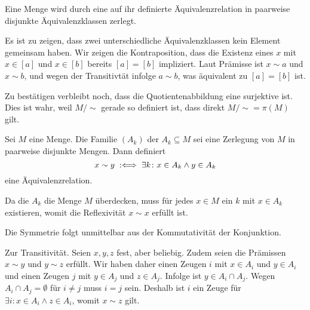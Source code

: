 \begin{Satz}\newlinefirst
Eine Menge wird durch eine auf ihr definierte Äquivalenzrelation
in paarweise disjunkte Äquivalenzklassen zerlegt.
\end{Satz}
\begin{Beweis}
Es ist zu zeigen, dass zwei unterschiedliche Äquivalenzklassen 
kein Element gemeinsam haben. Wir zeigen die Kontraposition, dass die
Existenz eines $x$ mit $x\in [a]$ und $x\in [b]$ bereits $[a]=[b]$ impliziert.
Laut Prämisse ist $x\sim a$ und $x\sim b$, und wegen der Transitivtät
infolge $a\sim b$, was äquivalent zu $[a]=[b]$ ist.

Zu bestätigen verbleibt noch, dass die Quotientenabbildung eine
surjektive ist. Dies ist wahr, weil $M/{\sim}$ gerade so definiert ist, 
dass direkt $M/{\sim}=\pi(M)$ gilt.\,\qedsymbol
\end{Beweis}

\begin{Satz}\newlinefirst
Sei $M$ eine Menge. Die Familie $(A_k)$ der $A_k\subseteq M$ sei
eine Zerlegung von $M$ in paarweise disjunkte Mengen. Dann definiert
\[x\sim y\;:\Longleftrightarrow\; \exists k\colon x\in A_k\land y\in A_k\]
eine Äquivalenzrelation.
\end{Satz}
\begin{Beweis}
Da die $A_k$ die Menge $M$ überdecken, muss für jedes $x\in M$
ein $k$ mit $x\in A_k$ existieren, womit die Reflexivität
$x\sim x$ erfüllt ist.

Die Symmetrie folgt unmittelbar aus der Kommutativität der Konjunktion.

Zur Transitivität. Seien $x,y,z$ fest, aber beliebig. Zudem seien die
Prämissen $x\sim y$ und $y\sim z$ erfüllt. Wir haben daher einen Zeugen
$i$ mit $x\in A_i$ und $y\in A_i$ und einen Zeugen $j$ mit $y\in A_j$
und $z\in A_j$. Infolge ist $y\in A_i\cap A_j$. Wegen
$A_i\cap A_j=\emptyset$ für $i\ne j$ muss $i=j$ sein. Deshalb ist
$i$ ein Zeuge für $\exists i\colon x\in A_i\land z\in A_i$, womit
$x\sim z$ gilt.\,\qedsymbol
\end{Beweis}

